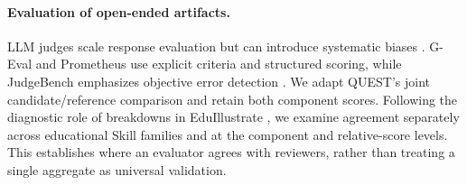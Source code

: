\paragraph{Evaluation of open-ended artifacts.}
LLM judges scale response evaluation but can introduce systematic biases
\citep{zheng2023judging}. G-Eval and Prometheus use explicit criteria and
structured scoring, while JudgeBench emphasizes objective error detection
\citep{geval,prometheus,judgebench}. We adapt QUEST's joint candidate/reference
comparison \citep{quest} and retain both component scores. Following the
diagnostic role of breakdowns in EduIllustrate \citep{eduillustrate}, we examine
agreement separately across educational Skill families and at the component
and relative-score levels. This establishes where an evaluator agrees with
reviewers, rather than treating a single aggregate as universal validation.
